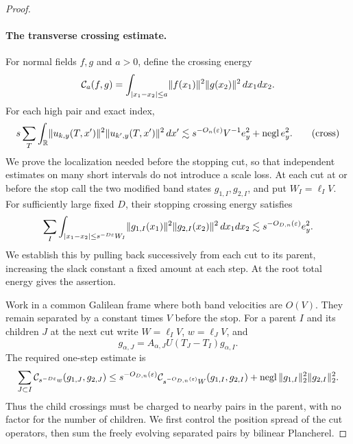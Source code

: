 \begin{proof}
\paragraph{The transverse crossing estimate.}
For normal fields $f,g$ and $a>0$, define the crossing energy
\[
 \mathcal C_a(f,g)=\int_{|x_1-x_2|\leq a}
                       \lVert f(x_1)\rVert^2\lVert g(x_2)\rVert^2\,dx_1dx_2.
\]
For each high pair and exact index,
\begin{equation}
 s\sum_T\int_\mathbb R
       \lVert u_{k,y}(T,x')\rVert^2\lVert u_{k',y}(T,x')\rVert^2\,dx'
 \lesssim s^{-O_n(\varepsilon)}V^{-1}e_y^2+\mathrm{negl}\,e_y^2.
 \tag{cross}\label{eq:cross}
\end{equation}
We prove the localization needed before the stopping cut, so that
independent estimates on many short intervals do not introduce a scale
loss. At each cut at or before the stop call the two modified band
states $g_{1,I},g_{2,I}$, and put $W_I=\ell_I V$. For sufficiently large
fixed $D$, their stopping crossing energy satisfies
\[
 \sum_I\int_{|x_1-x_2|\leq s^{-D\varepsilon}W_I}
       \lVert g_{1,I}(x_1)\rVert^2\lVert g_{2,I}(x_2)\rVert^2\,dx_1dx_2
 \lesssim s^{-O_{D,n}(\varepsilon)}e_y^2.
\]
We establish this by pulling back successively from each cut to its
parent, increasing the slack constant a fixed amount at each step.
At the root total energy gives the assertion.

Work in a common Galilean frame where both band velocities are $O(V)$.
They remain separated by a constant times $V$ before the stop.
For a parent $I$ and its children $J$ at the next cut write
$W=\ell_IV$, $w=\ell_JV$, and
\[
 g_{\alpha,J}=A_{\alpha,J}U(T_J-T_I)g_{\alpha,I}.
\]
The required one-step estimate is
\[
 \sum_{J\subset I}\mathcal C_{s^{-D\varepsilon}w}(g_{1,J},g_{2,J})
 \leq s^{-O_{D,n}(\varepsilon)}
       \mathcal C_{s^{-O_{D,n}(\varepsilon)}W}(g_{1,I},g_{2,I})
       +\mathrm{negl}\,\lVert g_{1,I}\rVert_2^2\lVert g_{2,I}\rVert_2^2.
\]
Thus the child crossings must be charged to nearby pairs in the parent,
with no factor for the number of children. We first control the position
spread of the cut operators, then sum the freely evolving separated
pairs by bilinear Plancherel.


\end{proof}
